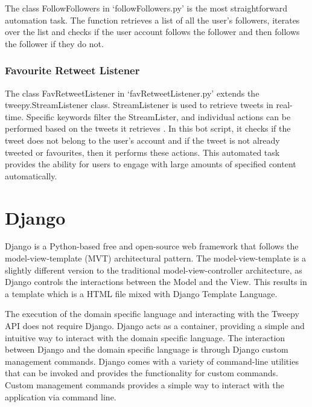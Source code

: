 The class FollowFollowers in `followFollowers.py' is the most straightforward automation task. The function retrieves a list of all the user's followers, iterates over the list and checks if the user account follows the follower and then follows the follower if they do not.
 
\subsubsection{Favourite Retweet Listener}
 
The class FavRetweetListener in `favRetweetListener.py' extends the tweepy.StreamListener class. StreamListener is used to retrieve tweets in real-time. Specific keywords filter the StreamLister, and individual actions can be performed based on the tweets it retrieves \cite{api}. In this bot script, it checks if the tweet does not belong to the user's account and if the tweet is not already tweeted or favourites, then it performs these actions. This automated task provides the ability for users to engage with large amounts of specified content automatically.

\section{Django}

Django is a Python-based free and open-source web framework that follows the model-view-template (MVT) architectural pattern. The model-view-template is a slightly different version to the traditional model-view-controller architecture, as Django controls the interactions between the Model and the View. This results in a template which is a HTML file mixed with Django Template Language. \newline \par

The execution of the domain specific language and interacting with the Tweepy API does not require Django. Django acts as a container, providing a simple and intuitive way to interact with the domain specific language. The interaction between Django and the domain specific language is through Django custom management commands. Django comes with a variety of command-line utilities that can be invoked and provides the functionality for custom commands. Custom management commands provides a simple way to interact with the application via command line. \newline \par

